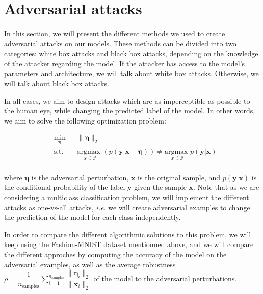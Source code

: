 \documentclass[11pt,twocolumn,letterpaper]{article}
\begin{document}
\section{Adversarial attacks}
\label{sec:attacks}

\paragraph{} In this section, we will present the different methods we used to create adversarial attacks on our models. These methods can be divided into two categories: white box attacks and black box attacks, depending on the knowledge of the attacker regarding the model. If the attacker has access to the model's parameters and architecture, we will talk about white box attacks. Otherwise, we will talk about black box attacks. 

In all cases, we aim to design attacks which are as imperceptible as possible to the human eye, while changing the predicted label of the model. In other words, we aim to solve the following optimization problem:

\begin{equation*}
\begin{aligned}
& \underset{\bm{\eta}}{\text{min}}
& & \|\bm{\eta}\|_2 \\
& \text{s.t.} 
& & \underset{\bm{y} \in \mathcal{Y}}{\text{argmax }}(p(\bm{y}|\bm{x} + \bm{\eta})) \neq \underset{\bm{y} \in \mathcal{Y}}{\text{argmax }}p(\bm{y}|\bm{x}) \\
\end{aligned}
\label{pb:gen}
\end{equation*}

where $\bm{\eta}$ is the adversarial perturbation, $\bm{x}$ is the original sample, and $p(\bm{y}|\bm{x})$ is the conditional probability of the label $\bm{y}$ given the sample $\bm{x}$. Note that as we are considering a multiclass classification problem, we will implement the different attacks as one-vs-all attacks, \textit{i.e.} we will create adversarial examples to change the prediction of the model for each class independently.

In order to compare the different algorithmic solutions to this problem, we will keep using the Fashion-MNIST dataset mentionned above, and we will compare the different approches by computing the accuracy of the model on the adversarial examples, as well as the average robustness $\rho = \displaystyle \dfrac{1}{n_{\text{samples}}} \sum \limits_{i=1}^{n_{\text{samples}}} \dfrac{\|\bm{\eta}_i \|_2}{\|\bm{x}_i\|_2}$ of the model to the adversarial perturbations.
\end{document}

